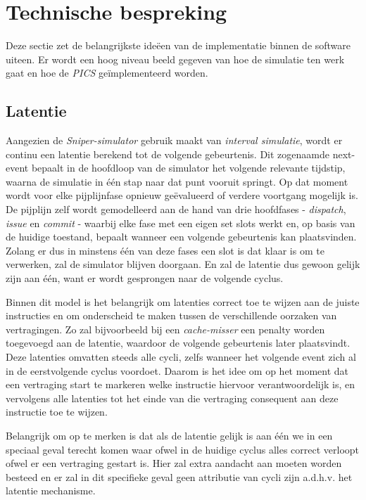 \documentclass[12pt,a4paper,faculty=ea,language=nl]{ugent-doc}
\begin{document}
\section{Technische bespreking}
Deze sectie zet de belangrijkste ideëen van de implementatie binnen de software uiteen. Er wordt een hoog niveau beeld gegeven van hoe de simulatie ten werk gaat en hoe de \textit{PICS} geïmplementeerd worden.
\subsection{Latentie}
\label{subsec:Latentie}
Aangezien de \textit{Sniper-simulator} gebruik maakt van \textit{interval simulatie}, wordt er continu een latentie berekend tot de volgende gebeurtenis. Dit zogenaamde next-event bepaalt in de hoofdloop van de simulator het volgende relevante tijdstip, waarna de simulatie in één stap naar dat punt vooruit springt. Op dat moment wordt voor elke pijplijnfase opnieuw geëvalueerd of verdere voortgang mogelijk is. De pijplijn zelf wordt gemodelleerd aan de hand van drie hoofdfases - \textit{dispatch}, \textit{issue} en \textit{commit} - waarbij elke fase met een eigen set slots werkt en, op basis van de huidige toestand, bepaalt wanneer een volgende gebeurtenis kan plaatsvinden. Zolang er dus in minstens één van deze fases een slot is dat klaar is om te verwerken, zal de simulator blijven doorgaan. En zal de latentie dus gewoon gelijk zijn aan één, want er wordt gesprongen naar de volgende cyclus.

Binnen dit model is het belangrijk om latenties correct toe te wijzen aan de juiste instructies en om onderscheid te maken tussen de verschillende oorzaken van vertragingen. Zo zal bijvoorbeeld bij een \textit{cache-misser} een penalty worden toegevoegd aan de latentie, waardoor de volgende gebeurtenis later plaatsvindt. Deze latenties omvatten steeds alle cycli, zelfs wanneer het volgende event zich al in de eerstvolgende cyclus voordoet. Daarom is het idee om op het moment dat een vertraging start te markeren welke instructie hiervoor verantwoordelijk is, en vervolgens alle latenties tot het einde van die vertraging consequent aan deze instructie toe te wijzen.

Belangrijk om op te merken is dat als de latentie gelijk is aan één we in een speciaal geval terecht komen waar ofwel in de huidige cyclus alles correct verloopt ofwel er een vertraging gestart is. Hier zal extra aandacht aan moeten worden besteed en er zal in dit specifieke geval geen attributie van cycli zijn a.d.h.v. het latentie mechanisme.
\end{document}

